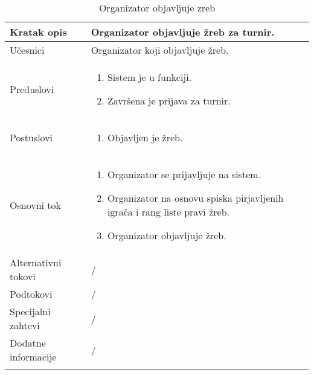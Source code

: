 \documentclass{article}
\begin{document}
\begin{longtable}{| p{} | p{} |} 
\hline
    Kratak opis & Organizator objavljuje žreb za turnir.\\ 
\hline    
    Učesnici & 
         Organizator koji objavljuje žreb.
    \\
\hline
   Preduslovi & \begin{enumerate}
       \item Sistem je u funkciji.
       \item Završena je prijava za turnir.
   \end{enumerate}\\
\hline  
    Postuslovi & \begin{enumerate}
        \item Objavljen je žreb.
    \end{enumerate}\\
\hline
    Osnovni tok & \begin{enumerate}
        \item Organizator se prijavljuje na sistem.
        \item Organizator na osnovu spiska pirjavljenih igrača i rang liste pravi žreb.
        \item Organizator objavljuje žreb.
    \end{enumerate}\\
\hline
    Alternativni tokovi & /\\
\hline
    Podtokovi & /\\
\hline
    Specijalni zahtevi & /\\
\hline
    Dodatne informacije & / \\
\hline
 
\caption{Organizator objavljuje zreb} 
\end{longtable}
\end{document}
